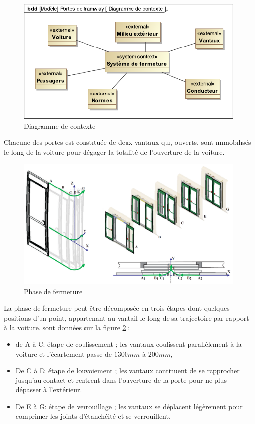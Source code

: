 \begin{figure}[!h]
 \centering\includegraphics[width=0.8\linewidth]{img/contexte}
 \caption{Diagramme de contexte}
 \label{fig1}
\end{figure}

\newpage

Chacune des portes est constituée de deux vantaux qui, ouverts, sont immobilisés le long de la voiture pour dégager la totalité de l'ouverture de la voiture.

\begin{figure}[!h]
 \centering\includegraphics[width=0.8\linewidth]{img/Portes3.png}
 \caption{Phase de fermeture}
 \label{fig2}
\end{figure}

La phase de fermeture peut être décomposée en trois étapes dont quelques positions d'un point, appartenant au vantail le long de sa trajectoire par rapport à la voiture, sont données sur la figure \ref{fig2} :
\begin{itemize}
 \item de A à C: étape de coulissement ; les vantaux coulissent parallèlement à la voiture et l'écartement passe de $1300mm$ à $200mm$,
 \item De C à E: étape de louvoiement ; les vantaux continuent de se rapprocher jusqu'au contact et rentrent dans l'ouverture de la porte pour ne plus dépasser à l'extérieur.
 \item De E à G: étape de verrouillage ; les vantaux se déplacent légèrement pour comprimer les joints d'étanchéité et se verrouillent.
\end{itemize}

